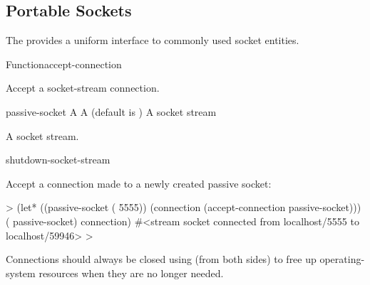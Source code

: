 \documentclass[10pt,twoside,english,pdftex]{article}
\begin{document}

\T\markright{}%
\T\pagestyle{plain}
\T\clearpage
\W{}
\T\pagestyle{fancy}
\T\thispagestyle{fancybottom}
\T\global\def\fnlastname{ }%
\subsection{Portable Sockets}
\label{sec:portablesockets}%

%
%
%
The   provides a uniform interface to
commonly used socket entities.

\W\entities
\T\clearpage


\begin{functiondoc}{Function}{accept-connection}{
     
    \returns{} } 
%
%
%

\fnsyntax

\fnpurpose Accept a socket-stream connection.

\fnpackage {}

\fnmodule {}

\fnargs
\begin{args}{passive-socket}
 A 
\arg[wait] A  (default is )
 A socket stream
\end{args}

\fnreturns A socket stream.

\begin{alsos}{shutdown-socket-stream}
\end{alsos}

%
%
\fnexample
Accept a connection made to a newly created passive socket:
%
\W\supp
\begin{example}
  > (let* ((passive-socket ( 5555))
           (connection (accept-connection passive-socket)))
       ( passive-socket)
       connection)
  #<stream socket connected from localhost/5555 to localhost/59946>
  >
\end{example}

\fnnote Connections should always be closed using  (from
both sides) to free up operating-system resources when they are no longer
needed.

\end{functiondoc}
\end{document}
